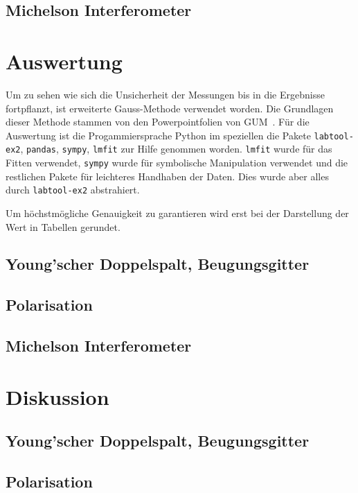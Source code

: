 \documentclass[12pt,english,ngerman]{scrartcl}
\begin{document}
\subsection{Michelson Interferometer}


\section{Auswertung}\label{sec:auswertung}

Um zu sehen wie sich die Unsicherheit der Messungen bis in die Ergebnisse
fortpflanzt, ist erweiterte Gauss-Methode verwendet worden. Die Grundlagen
dieser Methode stammen von den Powerpointfolien von
GUM~\cite{wolfgang_kessel_isobipm-gum_2004}. Für die Auswertung ist die
Progammiersprache Python im speziellen die Pakete \verb#labtool-ex2#,
\verb#pandas#, \verb#sympy#, \verb#lmfit# zur Hilfe genommen worden.
\verb#lmfit# wurde für das Fitten verwendet, \verb#sympy# wurde für symbolische
Manipulation verwendet und die restlichen Pakete für leichteres Handhaben der
Daten. Dies wurde aber alles durch \verb#labtool-ex2# abstrahiert.

Um höchstmögliche Genauigkeit zu garantieren wird erst bei der Darstellung der
Wert in Tabellen gerundet.

\subsection{Young'scher Doppelspalt, Beugungsgitter}


\subsection{Polarisation}


\subsection{Michelson Interferometer}

\section{Diskussion}\label{sec:diskussion}

\subsection{Young'scher Doppelspalt, Beugungsgitter}


\subsection{Polarisation}
\end{document}
